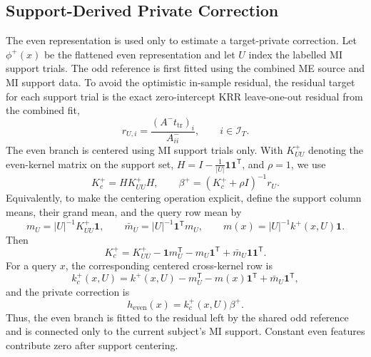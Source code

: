 \documentclass[preprint,12pt]{elsarticle}
\begin{document}
\subsection{Support-Derived Private Correction}
The even representation is used only to estimate a target-private correction. Let $\phi^+(x)$ be the flattened even representation and let $U$ index the labelled MI support trials. The odd reference is first fitted using the combined ME source and MI support data. To avoid the optimistic in-sample residual, the residual target for each support trial is the exact zero-intercept KRR leave-one-out residual from the combined fit,
\begin{equation}
r_{U,i}=\frac{(A^-t_{\mathrm{tr}})_i}{A^-_{ii}},\qquad i\in\mathcal I_T.
\end{equation}
The even branch is centered using MI support trials only. With $K^+_{UU}$ denoting the even-kernel matrix on the support set, $H=I-\frac{1}{|U|}\mathbf{1}\mathbf{1}^{\mathsf T}$, and $\rho=1$, we use
\begin{equation}
K^{+}_{c}=H K^+_{UU}H,\qquad
\beta^+=(K^{+}_{c}+\rho I)^{-1}r_U.
\end{equation}
Equivalently, to make the centering operation explicit, define the support
column means, their grand mean, and the query row mean by
\begin{equation}
m_U=|U|^{-1}K^+_{UU}\mathbf{1},\qquad
\bar m_U=|U|^{-1}\mathbf{1}^{\mathsf T}m_U,\qquad
m(x)=|U|^{-1}k^+(x,U)\mathbf{1}.
\end{equation}
Then
\begin{equation}
K^+_c=K^+_{UU}-\mathbf{1}m_U^{\mathsf T}-m_U\mathbf{1}^{\mathsf T}
      +\bar m_U\mathbf{1}\mathbf{1}^{\mathsf T}.
\end{equation}
For a query $x$, the corresponding centered cross-kernel row is
\begin{equation}
k^+_c(x,U)=k^+(x,U)-m_U^{\mathsf T}-m(x)\mathbf{1}^{\mathsf T}
      +\bar m_U\mathbf{1}^{\mathsf T},
\end{equation}
and the private correction is
\begin{equation}
h_{\mathrm{even}}(x)=k^+_c(x,U)\beta^+.
\end{equation}
Thus, the even branch is fitted to the residual left by the shared odd reference and is connected only to the current subject's MI support. Constant even features contribute zero after support centering.
\end{document}
